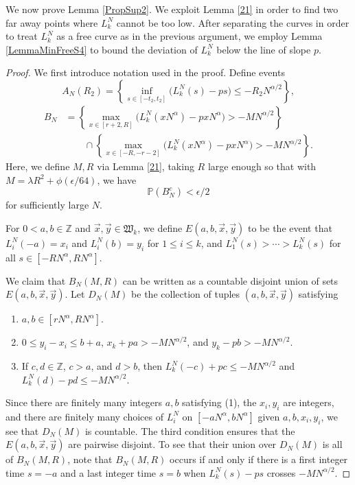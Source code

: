 	We now prove Lemma \ref{PropSup2}. We exploit Lemma \ref{21} in order to find two far away points where $L_k^N$ cannot be too low. After separating the curves in order to treat $L_k^N$ as a free curve as in the previous argument, we employ Lemma \ref{LemmaMinFreeS4} to bound the deviation of $L_k^N$ below the line of slope $p$.
	
	\begin{proof}
		We first introduce notation used in the proof. Define events
		\[
		A_N(R_2) = \left\{\inf_{s \in [ -t_2, t_2 ]}\big(L^N_k(s) - p s \big) \leq - R_2N^{\alpha/2}\right\},
		\]
		\begin{align*}
		B_N &= \left\{ \max_{x\in [r+2, R]} \big(L^N_k(xN^\alpha) - pxN^\alpha\big) > -MN^{\alpha/2} \right\}\\
		&\qquad \cap \left\{ \max_{x\in [-R, -r-2]} \big(L^N_k(xN^\alpha) - pxN^\alpha\big) > -MN^{\alpha/2} \right\}.
		\end{align*}
		Here, we define $M,R$ via Lemma \ref{21}, taking $R$ large enough so that with $M = \lambda R^2 + \phi(\epsilon/64)$, we have 
		\begin{equation}\label{4.3Bbound}
		\mathbb{P}(B_N^c) < \epsilon/2
		\end{equation} 
		for sufficiently large $N$. 
		
		For $0<a,b\in\mathbb{Z}$ and $\vec{x},\vec{y}\in\mathfrak{W}_k$, we define $E(a,b,\vec{x},\vec{y})$ to be the event that $L_i^N(-a) = x_i$ and $L_i^N(b) = y_i$ for $1\leq i\leq k$, and $L_1^N(s) > \cdots > L_k^N(s)$ for all $s\in[-RN^\alpha,RN^\alpha]$.
		
		We claim that $B_N(M,R)$ can be written as a countable disjoint union of sets $E(a,b,\vec{x},\vec{y})$. Let $D_N(M)$ be the collection of tuples $(a,b,\vec{x},\vec{y})$ satisfying 
		\begin{enumerate}[label=(\arabic*)]
			
			\item $a,b\in[rN^\alpha,RN^\alpha]$.
			
			\item $0 \leq y_i - x_i \leq b+a$, $x_k + pa > - MN^{\alpha/2}$, and $y_k - pb > - MN^{\alpha/2}$.
			
			\item If $c,d\in\mathbb{Z}$, $c > a$, and $d>b$, then $L_k^N(-c) + pc \leq -MN^{\alpha/2}$ and $L_k^N(d) - pd \leq -MN^{\alpha/2}$.
			
		\end{enumerate} 
		Since there are finitely many integers $a,b$ satisfying (1), the $x_i,y_i$ are integers, and there are finitely many choices of $L_i^N$ on $[-aN^\alpha, bN^\alpha]$ given $a,b,x_i,y_i$, we see that $D_N(M)$ is countable. The third condition ensures that the $E(a,b,\vec{x},\vec{y})$ are pairwise disjoint. To see that their union over $D_N(M)$ is all of $B_N(M,R)$, note that $B_N(M,R)$ occurs if and only if there is a first integer time $s=-a$ and a last integer time $s=b$ when $L_k^N(s)-ps$ crosses $-MN^{\alpha/2}$.
		

\end{proof}
